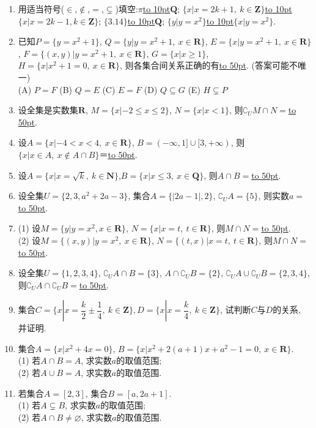 \documentclass[10pt,a4paper]{article}
\newcommand{\blank}[1]{\underline{\hbox to #1pt{}}}
\begin{document}
\begin{enumerate}[1.]
\item 用适当符号($\in$,$\notin$,$=$,$\subsetneq$)填空:$\pi$\blank{10}$\mathbf{Q}$; $\{x|x=2k+1, \ k\in \mathbf{Z}\}$\blank{10}$\{x|x=2k-1,k\in \mathbf{Z}\}$; $\{3.14\}$\blank{10}$\mathbf{Q}$; $\{y|y=x^2\}$\blank{10}$\{x|y=x^2\}$.  
\item 已知$P=\{y=x^2+1\}$, $Q=\{y|y=x^2+1, \ x\in \mathbf{R}\}$, $E=\{x|y=x^2+1, \  x\in \mathbf{R}\}$, $F=\{(x,y)|y=x^2+1, \ x\in \mathbf{R}\}$, $G=\{x|x\ge 1\}$, $H=\{x|x^2+1=0, \ x\in \mathbf{R}\}$, 则各集合间关系正确的有\blank{50}. (答案可能不唯一)\\
(A) $P=F$   (B) $Q=E$   (C) $E=F$   (D) $Q\subseteq G$  (E) $H\subsetneq P$
\item 设全集是实数集$\mathbf{R}$, $M=\{x|-2 \le x\le 2\}$, $N=\{x|x<1\}$, 则$\complement_U M\cap N=$\blank{50}.
\item 设$A=\{x|-4<x<4, \ x\in \mathbf{R}\}$, $B=(-\infty,1]\cup [3,+\infty)$, 则$\{x|x\in A, \ x\notin A\cap B  \}$＝\blank{50}.
\item 设$A=\{x|x=\sqrt k, \ k\in \mathbf{N}\}$,$B=\{x|x\le 3,\ x\in \mathbf{Q}\}$, 则$A\cap B=$\blank{50}.
\item 设全集$U=\{2,3,a^2+2a-3\}$, 集合$A=\{|2a-1|,2\}$, $\complement_U A=\{5\}$, 则实数$a=$\blank{50}.
\item (1) 设$M=\{y|y=x^2, x\in \mathbf{R}\}$, $N=\{x|x=t,\ t\in \mathbf{R}\}$, 则$M\cap N=$\blank{50}.\\
(2) 设$M=\{(x,y)|y=x^2,\ x\in \mathbf{R}\}$, $N=\{(t,x)|x=t,\ t\in \mathbf{R}\}$, 则$M\cap N=$\blank{50}.
\item 设全集$U=\{1,2,3,4\}$, $\complement_U A\cap B=\{3\}$, $A\cap \complement_U B=\{2\}$, $\complement_U A\cup \complement_U B=\{2,3,4\}$, 则$\complement_U A\cap \complement_U B=$\blank{50}.
\item 集合$C=\{x|x=\dfrac k2\pm \dfrac14, \ k\in \mathbf{Z}\},D=\{x|x=\dfrac k4,\ k\in \mathbf{Z}\}$, 试判断$C$与$D$的关系, 并证明.
\item 集合$A=\{x|x^2+4x=0\}$, $B=\{x|x^2+2(a+1)x+a^2-1=0,\ x\in \mathbf{R}\}$.\\
(1) 若$A\cap B=A$, 求实数$a$的取值范围;\\
(2) 若$A\cup B=A$, 求实数$a$的取值范围.
\item 若集合$A=[2,3]$, 集合$B=[a,2a+1]$.\\
(1) 若$A\subsetneq B$, 求实数$a$的取值范围;\\
(2) 若$A\cap B\ne \varnothing$, 求实数$a$的取值范围.

\end{enumerate}
\end{document}
